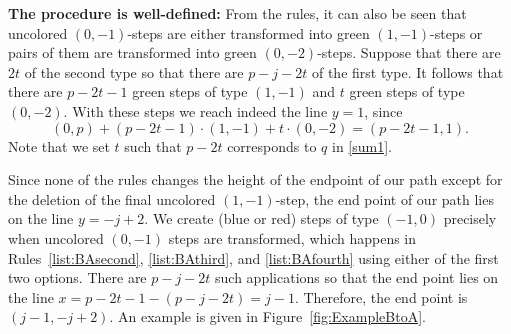 \documentclass[12pt]{amsart}
\theoremstyle{definition}
\numberwithin{equation}{section}
\begin{document}
{\bf The procedure is well-defined:} From the rules, it can also be seen that uncolored $(0,-1)$-steps are either transformed into green $(1,-1)$-steps or pairs of them are transformed into green $(0,-2)$-steps. Suppose that there are $2t$ of the second type so that there are $p-j-2t$ of the first type. It follows that there are $p-2t-1$ green steps of type $(1,-1)$ and $t$ green steps of type $(0,-2)$. With these steps we reach indeed the line $y=1$, since
\[
(0,p) + (p-2t-1) \cdot (1,-1) + t \cdot (0,-2) =  (p-2t-1,1). 
\]
Note that we set $t$ such that $p-2t$ corresponds to  $q$ in \eqref{sum1}.

Since none of the rules changes the height of the endpoint of our path except for the deletion of the final uncolored $(1,-1)$-step, the end point of our path lies on the line $y=-j+2$. We create (blue or red) steps of type $(-1,0)$ precisely when uncolored $(0,-1)$ steps are transformed, which happens in Rules~\eqref{list:BAsecond}, \eqref{list:BAthird}, and \eqref{list:BAfourth} using either of the first two options. There are $p-j-2t$ such applications so that the end point lies on the line $x=p-2t-1-(p-j-2t)=j-1$. Therefore, the end point is $(j-1,-j+2)$. An example is given in Figure~\ref{fig:ExampleBtoA}.
\end{document}
